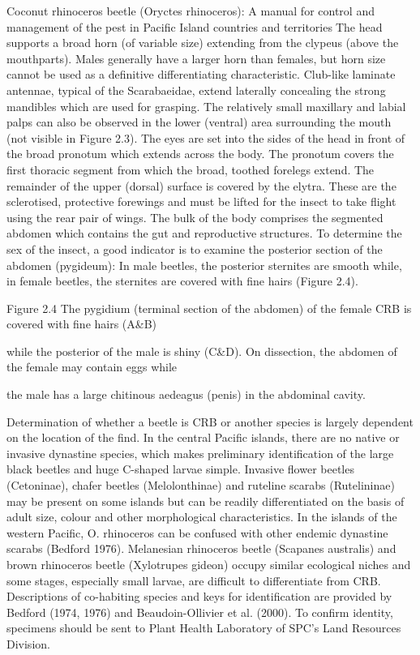 \documentclass[twocolumn,letterpaper]{scrartcl}
\begin{document}
Coconut rhinoceros beetle (Oryctes rhinoceros): A manual for control and management of the pest in Pacific Island countries and territoriesThe  head  supports  a  broad  horn  (of  variable  size)  extending  from  the  clypeus  (above  the  mouthparts). 
Males generally have a larger horn than females, but horn size cannot be used as a definitive differentiating 
characteristic. Club-like laminate antennae, typical of the Scarabaeidae, extend laterally concealing the strong 
mandibles which are used for grasping. The relatively small maxillary and labial palps can also be observed in 
the lower (ventral) area surrounding the mouth (not visible in Figure 2.3). The eyes are set into the sides of the 
head in front of the broad pronotum which extends across the body. The pronotum covers the first thoracic 
segment from which the broad, toothed forelegs extend. The remainder of the upper (dorsal) surface is covered 
by the elytra. These are the sclerotised, protective forewings and must be lifted for the insect to take flight using 
the rear pair of wings. The bulk of the body comprises the segmented abdomen which contains the gut and 
reproductive structures. To determine the sex of the insect, a good indicator is to examine the posterior section 
of the abdomen (pygideum): In male beetles, the posterior sternites are smooth while, in female beetles, the 
sternites are covered with fine hairs (Figure 2.4). 

Figure 2.4 The pygidium (terminal section of the abdomen) of the female CRB is covered with fine hairs (A\&B) 

while the posterior of the male is shiny (C\&D). On dissection, the abdomen of the female may contain eggs while 

the male has a large chitinous aedeagus (penis) in the abdominal cavity. 

Determination  of  whether  a  beetle  is  CRB  or  another  species  is  largely  dependent  on  the  location  of  the 
find. In the central Pacific islands, there are no native or invasive dynastine species, which makes preliminary 
identification of the large black beetles and huge C-shaped larvae simple. Invasive flower beetles (Cetoninae), 
chafer beetles (Melolonthinae) and ruteline scarabs (Rutelininae) may be present on some islands but can be 
readily differentiated on the basis of adult size, colour and other morphological characteristics. In the islands 
of the western Pacific, O. rhinoceros can be confused with other endemic dynastine scarabs (Bedford 1976). 
Melanesian rhinoceros beetle (Scapanes australis) and brown rhinoceros beetle (Xylotrupes gideon) occupy similar 
ecological niches and some stages, especially small larvae, are difficult to differentiate from CRB. Descriptions 
of co-habiting species and keys for identification are provided by Bedford (1974, 1976) and Beaudoin-Ollivier et al. 
(2000). To confirm identity, specimens should be sent to Plant Health Laboratory of SPC’s Land Resources Division.
\end{document}
